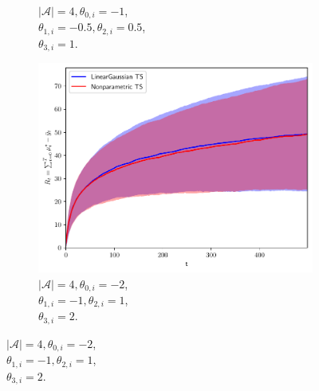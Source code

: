 \begin{figure}[!h]
\begin{subfigure}[b]{0.32\textwidth}
		\vspace*{-5ex}
		\caption{$|\mathcal{A}|=4, \theta_{0,i}=-1$,\\ \hspace*{0.3cm} $\theta_{1,i}=-0.5, \theta_{2,i}=0.5$,\\ \hspace*{0.3cm} $\theta_{3,i}=1$.}
		\label{fig:linear_gaussian_A4_05}
	\end{subfigure}
	\begin{subfigure}[b]{0.32\textwidth}
		\includegraphics[width=\textwidth]{./figs/linearGaussian/cumregret_A4_-2_-2_-1_-1_1_1_2_2_1_1_1_1}
		\vspace*{-5ex}
		\caption{$|\mathcal{A}|=4, \theta_{0,i}=-2$,\\ \hspace*{0.3cm} $\theta_{1,i}=-1, \theta_{2,i}=1$,\\ \hspace*{0.3cm} $\theta_{3,i}=2$.}
		\label{fig:linear_gaussian_A4_1}
	\end{subfigure}
	

\end{figure}
